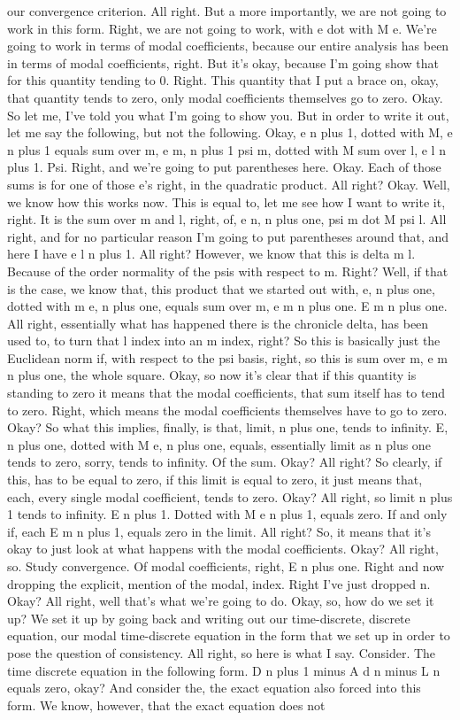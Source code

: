 \documentclass[10pt]{article}
\begin{document}
our convergence criterion. All right. But a more importantly, we are not going to work in this form. Right, we are not going to work, with e dot with M e. We're going to work in terms of modal coefficients, because our entire analysis has been in terms of modal coefficients, right. But it's okay, because I'm going show that for this quantity tending to 0. Right. This quantity that I put a brace on, okay, that quantity tends to zero, only modal coefficients themselves go to zero. Okay. So let me, I've told you what I'm going to show you. But in order to write it out, let me say the following, but not the following. Okay, e n plus 1, dotted with M, e n plus 1 equals sum over m, e m, n plus 1 psi m, dotted with M sum over l, e l n plus 1. Psi. Right, and we're going to put parentheses here. Okay. Each of those sums is for one of those e's right, in the quadratic product. All right? Okay. Well, we know how this works now. This is equal to, let me see how I want to write it, right. It is the sum over m and l, right, of, e n, n plus one, psi m dot M psi l. All right, and for no particular reason I'm going to put parentheses around that, and here I have e l n plus 1. All right? However, we know that this is delta m l. Because of the order normality of the psis with respect to m. Right? Well, if that is the case, we know that, this product that we started out with, e, n plus one, dotted with m e, n plus one, equals sum over m, e m n plus one. E m n plus one. All right, essentially what has happened there is the chronicle delta, has been used to, to turn that l index into an m index, right? So this is basically just the Euclidean norm if, with respect to the psi basis, right, so this is sum over m, e m n plus one, the whole square. Okay, so now it's clear that if this quantity is standing to zero it means that the modal coefficients, that sum itself has to tend to zero. Right, which means the modal coefficients themselves have to go to zero. Okay? So what this implies, finally, is that, limit, n plus one, tends to infinity. E, n plus one, dotted with M e, n plus one, equals, essentially limit as n plus one tends to zero, sorry, tends to infinity. Of the sum. Okay? All right? So clearly, if this, has to be equal to zero, if this limit is equal to zero, it just means that, each, every single modal coefficient, tends to zero. Okay? All right, so limit n plus 1 tends to infinity. E n plus 1. Dotted with M e n plus 1, equals zero. If and only if, each E m n plus 1, equals zero in the limit. All right? So, it means that it's okay to just look at what happens with the modal coefficients. Okay? All right, so. Study convergence. Of modal coefficients, right, E n plus one. Right and now dropping the explicit, mention of the modal, index. Right I've just dropped n. Okay? All right, well that's what we're going to do. Okay, so, how do we set it up? We set it up by going back and writing out our time-discrete, discrete equation, our modal time-discrete equation in the form that we set up in order to pose the question of consistency. All right, so here is what I say. Consider. The time discrete equation in the following form. D n plus 1 minus A d n minus L n equals zero, okay? And consider the, the exact equation also forced into this form. We know, however, that the exact equation does not 
\end{document}
